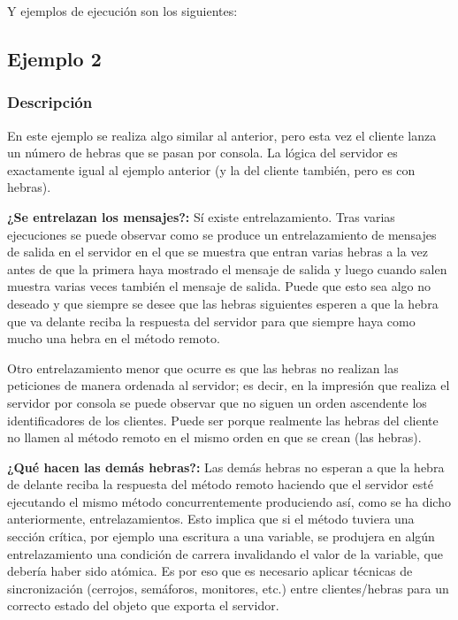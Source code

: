 \documentclass{article}
\begin{document}
Y ejemplos de ejecución son los siguientes:



\subsection{Ejemplo 2}
\subsubsection{Descripción}
En este ejemplo se realiza algo similar al anterior, pero esta vez el cliente lanza un número de hebras que se pasan por consola. La lógica del servidor es exactamente igual al ejemplo anterior (y la del cliente también, pero es con hebras).

\textbf{¿Se entrelazan los mensajes?: }Sí existe entrelazamiento. Tras varias ejecuciones se puede observar como se produce un entrelazamiento de mensajes de salida en el servidor en el que se muestra que entran varias hebras a la vez antes de que la primera haya mostrado el mensaje de salida y luego cuando salen muestra varias veces también el mensaje de salida. Puede que esto sea algo no deseado y que siempre se desee que las hebras siguientes esperen a que la hebra que va delante reciba la respuesta del servidor para que siempre haya como mucho una hebra en el método remoto.


Otro entrelazamiento menor que ocurre es que las hebras no realizan las peticiones de manera ordenada al servidor; es decir, en la impresión que realiza el servidor por consola se puede observar que no siguen un orden ascendente los identificadores de los clientes. Puede ser porque realmente las hebras del cliente no llamen al método remoto en el mismo orden en que se crean (las hebras).

\textbf{¿Qué hacen las demás hebras?: }Las demás hebras no esperan a que la hebra de delante reciba la respuesta del método remoto haciendo que el servidor esté ejecutando el mismo método concurrentemente produciendo así, como se ha dicho anteriormente, entrelazamientos.  
Esto implica que si el método tuviera una sección crítica, por ejemplo una escritura a una variable, se produjera en algún entrelazamiento una condición de carrera invalidando el valor de la variable, que debería haber sido atómica. Es por eso que es necesario aplicar técnicas de sincronización (cerrojos, semáforos, monitores, etc.) entre clientes/hebras para un correcto estado del objeto que exporta el servidor.
\end{document}

